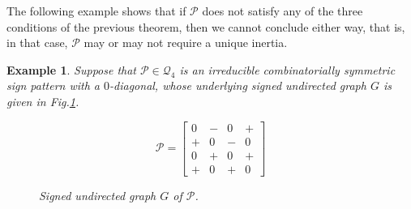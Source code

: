 \documentclass[10pt,a4paper]{amsart}
\newtheorem{eg}{Example}[section]
\numberwithin{equation}{section}
\begin{document}

The following example shows that if $\mathcal{P}$ does not satisfy any of the three conditions of the previous theorem, then we cannot conclude either way, that is, in that case, $\mathcal{P}$ may or may not require a unique inertia.

\begin{eg}\label{eg0.6}
	Suppose that $\mathcal{P}\in \mathcal{Q}_4$ is an irreducible combinatorially symmetric sign pattern with a $0$-diagonal, whose underlying signed undirected graph $G$ is given in Fig.\ref{fign1}.
	\begin{figure}[H]
		\centering
		\begin{minipage}{.45\textwidth}
			\vspace{-1cm}
			\[
			\mathcal{P}=
			\begin{bmatrix}
				0 & - & 0 & + \\
				+ & 0 & - & 0 \\
				0 & + & 0 & + \\
				+ & 0 & + & 0
			\end{bmatrix}
			\]
		\end{minipage}
		\hspace{0.05\textwidth}
		\begin{minipage}{.45\textwidth}
			\centering
			\tikzset{node distance=1cm}
			\caption{Signed undirected graph $ G$ of $\mathcal{P}$.}
			\label{fign1}
		\end{minipage}
	\end{figure}
	

\end{eg}
\end{document}
